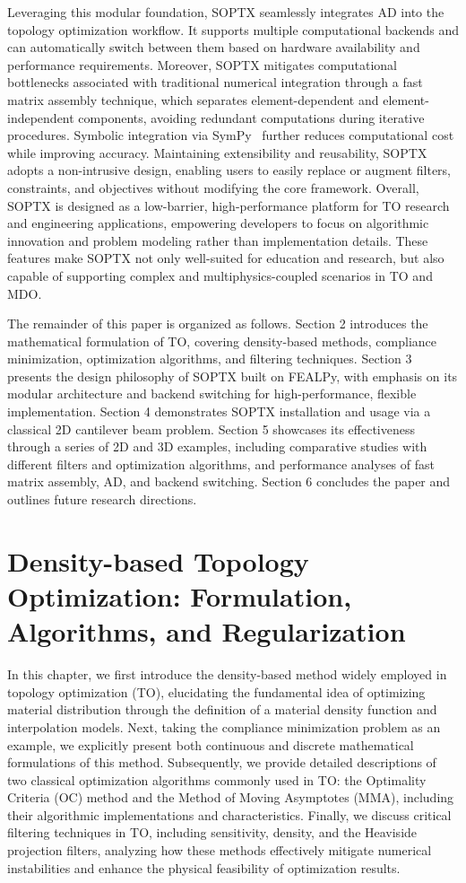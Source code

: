 \documentclass[mathpazo]{cicp}
\begin{document}
Leveraging this modular foundation, SOPTX seamlessly integrates AD into the topology optimization workflow. It supports multiple computational backends and can automatically switch between them based on hardware availability and performance requirements. Moreover, SOPTX mitigates computational bottlenecks associated with traditional numerical integration through a fast matrix assembly technique, which separates element-dependent and element-independent components, avoiding redundant computations during iterative procedures. Symbolic integration via SymPy~\cite{unknown} further reduces computational cost while improving accuracy. Maintaining extensibility and reusability, SOPTX adopts a non-intrusive design, enabling users to easily replace or augment filters, constraints, and objectives without modifying the core framework. Overall, SOPTX is designed as a low-barrier, high-performance platform for TO research and engineering applications, empowering developers to focus on algorithmic innovation and problem modeling rather than implementation details. These features make SOPTX not only well-suited for education and research, but also capable of supporting complex and multiphysics-coupled scenarios in TO and MDO.

The remainder of this paper is organized as follows. Section 2 introduces the mathematical formulation of TO, covering density-based methods, compliance minimization, optimization algorithms, and filtering techniques. Section 3 presents the design philosophy of SOPTX built on FEALPy, with emphasis on its modular architecture and backend switching for high-performance, flexible implementation. Section 4 demonstrates SOPTX installation and usage via a classical 2D cantilever beam problem. Section 5 showcases its effectiveness through a series of 2D and 3D examples, including comparative studies with different filters and optimization algorithms, and performance analyses of fast matrix assembly, AD, and backend switching. Section 6 concludes the paper and outlines future research directions.

\section{Density-based Topology Optimization: Formulation, Algorithms, and Regularization}\label{sec:math}
In this chapter, we first introduce the density-based method widely employed in topology optimization (TO), elucidating the fundamental idea of optimizing material distribution through the definition of a material density function and interpolation models. Next, taking the compliance minimization problem as an example, we explicitly present both continuous and discrete mathematical formulations of this method. Subsequently, we provide detailed descriptions of two classical optimization algorithms commonly used in TO: the Optimality Criteria (OC) method and the Method of Moving Asymptotes (MMA), including their algorithmic implementations and characteristics. Finally, we discuss critical filtering techniques in TO, including sensitivity, density, and the Heaviside projection filters, analyzing how these methods effectively mitigate numerical instabilities and enhance the physical feasibility of optimization results.
\end{document}
